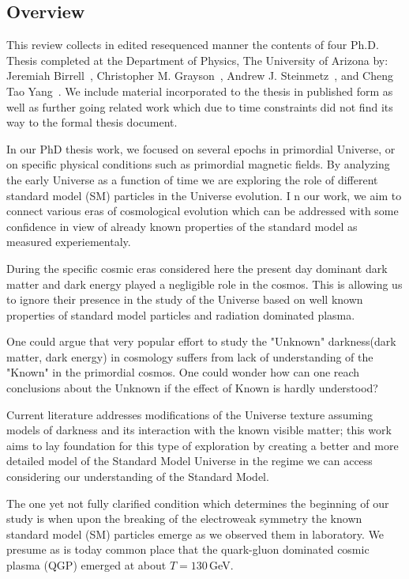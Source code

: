 \subsection{Overview} 
\label{sec:context}
This review collects in edited resequenced manner the contents of four Ph.D. Thesis completed at the Department of Physics, The University of Arizona by: Jeremiah Birrell~\cite{BirrellThesis:2014}, Christopher M. Grayson~\cite{GraysonThesis:2024}, Andrew J. Steinmetz~\cite{SteinmetzThesis:2023}, and Cheng Tao Yang~\cite{YangThesis:2023}. We include material incorporated to the thesis in published form as well as further going related work which due to time constraints did not find its way to the formal thesis document.

In our PhD thesis work, we focused on several epochs in primordial Universe, or on specific physical conditions such as primordial magnetic fields. By analyzing the early Universe as a function of time we are exploring the role of different standard model (SM) particles in the Universe evolution. I n our work, we aim to connect various eras of cosmological evolution which can be addressed with some confidence in view of already known properties of the standard model as measured experiementaly. 

During the specific cosmic eras considered here the present day dominant dark matter and dark energy played a negligible role in the cosmos. This is allowing us to ignore their presence in the study of the Universe based on well known properties of standard model particles and radiation dominated plasma. 

One could argue that very popular effort to study the "Unknown" darkness(dark matter, dark energy) in cosmology suffers from lack of understanding of the "Known" in the primordial cosmos. One could wonder how can one reach conclusions about the Unknown if the effect of Known is hardly understood?

Current literature addresses modifications of the Universe texture assuming models of darkness and its interaction with the known visible matter; this work aims to lay foundation for this type of exploration by creating a better and more detailed model of the Standard Model Universe in the regime we can access considering our understanding of the Standard Model. 

The one yet not fully clarified condition which determines the beginning of our study is when upon the breaking of the electroweak symmetry the known standard model (SM) particles emerge as we observed them in laboratory. We presume as is today common place that the quark-gluon dominated cosmic plasma (QGP) emerged at about $T=130$\,GeV. 

